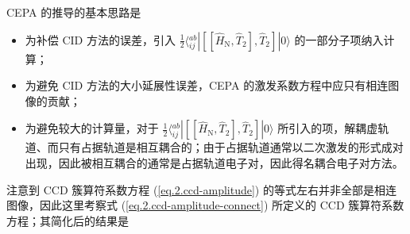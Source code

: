 CEPA 的推导的基本思路是
\begin{itemize}[nosep]
  \item 为补偿 CID 方法的误差，引入 $\frac{1}{2} \langle {}_{ij}^{ab} | [[\hat H_\mathrm{N}, \hat T_2], \hat T_2] | 0 \rangle$ 的一部分子项纳入计算；
  \item 为避免 CID 方法的大小延展性误差，CEPA 的激发系数方程中应只有相连图像的贡献\cite{Brueckner-Brueckner.PR.1955, Goldstone-Goldstone.PRSLA.1957}；
  \item 为避免较大的计算量，对于 $\frac{1}{2} \langle {}_{ij}^{ab} | [[\hat H_\mathrm{N}, \hat T_2], \hat T_2] | 0 \rangle$ 所引入的项，解耦虚轨道、而只有占据轨道是相互耦合的；由于占据轨道通常以二次激发的形式成对出现，因此被相互耦合的通常是占据轨道电子对，因此得名耦合电子对方法。
\end{itemize}

注意到 CCD 簇算符系数方程 (\ref{eq.2.ccd-amplitude}) 的等式左右并非全部是相连图像，因此这里考察式 (\ref{eq.2.ccd-amplitude-connect}) 所定义的 CCD 簇算符系数方程；其简化后的结果是



